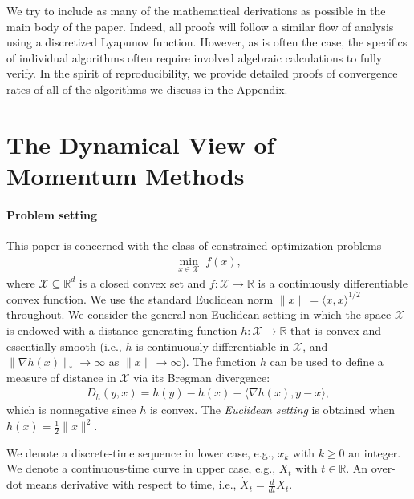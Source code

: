 \documentclass[11pt]{article}
\theoremstyle{plain}
\newcommand{\R}{{\mathbb R}}
\newcommand{\X}{{\mathcal X}}
\begin{document}
 We try to include as many of the mathematical derivations as possible in the main body of the paper.  Indeed, all proofs will follow a similar flow of analysis using a discretized Lyapunov function.  However, as is often the case, the specifics of individual algorithms often require involved algebraic calculations to fully verify.   In the spirit of reproducibility, we provide detailed proofs of convergence rates of all of the algorithms we discuss in the Appendix.

\section{The Dynamical View of Momentum Methods}

\paragraph{Problem setting}
This paper is concerned with the class of constrained optimization problems
\begin{align}\label{eq:main-problem}
\min_{x \in \X} \; f(x),
\end{align}
where $\X \subseteq \R^d$ is a closed convex set and $f \colon \X \to \R$ is a continuously differentiable convex function. 
We use the standard Euclidean norm $\|x\| = \langle x,x \rangle^{1/2}$ throughout.
We consider the general non-Euclidean setting in which the space $\X$ is endowed with a distance-generating function $h \colon \X \to \R$ that is convex and essentially smooth (i.e., $h$ is continuously differentiable in $\X$, and $\|\nabla h(x)\|_* \to \infty$ as $\|x\| \to \infty$). The function $h$ can be used to define a measure of distance in $\X$ via its Bregman divergence:
\begin{align*}
D_h(y,x) = h(y) - h(x) - \langle \nabla h(x), y-x \rangle,
\end{align*}
which is nonnegative since $h$ is convex. 
The \emph{Euclidean setting} is obtained when $h(x) = \frac{1}{2} \|x\|^2$.

We denote a discrete-time sequence in lower case, e.g., $x_k$ with $k \ge 0$ an integer. We denote a continuous-time curve in upper case, e.g., $X_t$ with $t \in \R$. An over-dot means derivative with respect to time, i.e., $\dot X_t = \frac{d}{dt} X_t$.
\end{document}
